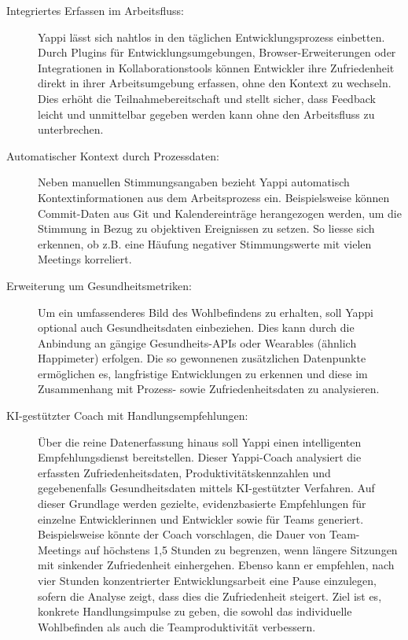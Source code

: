 \documentclass[12pt,a4paper]{report}
\begin{document}
\begin{description}
  \item[Integriertes Erfassen im Arbeitsfluss:] Yappi lässt sich nahtlos in den täglichen Entwicklungsprozess einbetten. Durch 
    Plugins für Entwicklungsumgebungen, Browser-Erweiterungen oder Integrationen in Kollaborationstools können Entwickler ihre
    Zufriedenheit direkt in ihrer Arbeitsumgebung erfassen, ohne den Kontext zu wechseln. Dies erhöht die Teilnahmebereitschaft
    und stellt sicher, dass Feedback leicht und unmittelbar gegeben werden kann ohne den Arbeitsfluss zu unterbrechen.
  \item[Automatischer Kontext durch Prozessdaten:] Neben manuellen Stimmungsangaben bezieht Yappi automatisch Kontextinformationen
    aus dem Arbeitsprozess ein. Beispielsweise können Commit-Daten aus Git und Kalendereinträge herangezogen werden, um die Stimmung
    in Bezug zu objektiven Ereignissen zu setzen. So liesse sich erkennen, ob z.B. eine Häufung negativer Stimmungswerte mit vielen
    Meetings korreliert.
  \item[Erweiterung um Gesundheitsmetriken:] Um ein umfassenderes Bild des Wohlbefindens zu erhalten, soll Yappi optional auch
    Gesundheitsdaten einbeziehen. Dies kann durch die Anbindung an gängige Gesundheits-APIs oder Wearables (ähnlich Happimeter)
    erfolgen. Die so gewonnenen zusätzlichen Datenpunkte ermöglichen es, langfristige Entwicklungen zu erkennen und diese im
    Zusammenhang mit Prozess- sowie Zufriedenheitsdaten zu analysieren.
  \item[KI-gestützter Coach mit Handlungsempfehlungen:] Über die reine Datenerfassung hinaus soll Yappi einen intelligenten
    Empfehlungsdienst bereitstellen. Dieser Yappi-Coach analysiert die erfassten Zufriedenheitsdaten, Produktivitätskennzahlen und
    gegebenenfalls Gesundheitsdaten mittels KI-gestützter Verfahren. Auf dieser Grundlage werden gezielte, evidenzbasierte
    Empfehlungen für einzelne Entwicklerinnen und Entwickler sowie für Teams generiert. Beispielsweise könnte der Coach vorschlagen,
    die Dauer von Team-Meetings auf höchstens 1,5 Stunden zu begrenzen, wenn längere Sitzungen mit sinkender Zufriedenheit
    einhergehen. Ebenso kann er empfehlen, nach vier Stunden konzentrierter Entwicklungsarbeit eine Pause einzulegen, sofern die
    Analyse zeigt, dass dies die Zufriedenheit steigert. Ziel ist es, konkrete Handlungsimpulse zu geben, die sowohl das
    individuelle Wohlbefinden als auch die Teamproduktivität verbessern.
\end{description}
\end{document}
